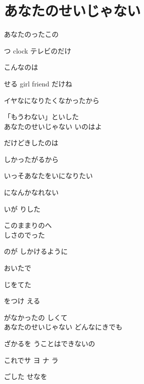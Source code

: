 \section{ あなたのせいじゃない}
\large{

あなたのったこの

つ clock テレビのだけ

こんなのは

せる girl friend だけね

イヤなになりたくなかったから

「もうわない」といした
\\

あなたのせいじゃない いのはよ

だけどきしたのは

しかったがるから

いっそあなたをいになりたい

になんかなれない

いが りした

このままりのへ
\\

しさのでった

のが しかけるように

おいたで

じをてた

をつけ える

がなかったの しくて
\\

あなたのせいじゃない どんなにきでも

ざかるを うことはできないの

これでサ ヨ ナ ラ

ごした せなを

}
